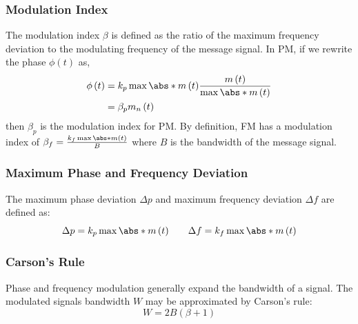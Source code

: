 \documentclass{article}
\begin{document}
\subsubsection{Modulation Index}
The modulation index \(\beta\) is defined as the ratio of the maximum frequency deviation to the modulating frequency of the message signal.
In PM, if we rewrite the phase \(\phi\left( t \right)\) as,
\begin{align*}
    \phi\left( t \right) & = k_p \max{\abs*{m\left( t \right)}} \frac{m\left( t \right)}{\max{\abs*{m\left( t \right)}}} \\
                         & = \beta_p m_n\left( t \right)
\end{align*}
then \(\beta_p\) is the modulation index for PM.
By definition, FM has a modulation index of \(\beta_f = \frac{k_f \max{\abs*{m\left( t \right)}}}{B}\)
where \(B\) is the bandwidth of the message signal.
\subsubsection{Maximum Phase and Frequency Deviation}
The maximum phase deviation \(\Delta p\) and maximum frequency deviation \(\Delta f\) are defined as:
\begin{equation*}
    \Delta p = k_p \max{\abs*{m\left( t \right)}} \qquad \Delta f = k_f \max{\abs*{m\left( t \right)}}
\end{equation*}
\subsubsection{Carson's Rule}
Phase and frequency modulation generally expand the bandwidth of a signal.
The modulated signals bandwidth \(W\) may be approximated by Carson's rule:
\begin{equation*}
    W = 2B \left( \beta + 1 \right)
\end{equation*}
\end{document}
